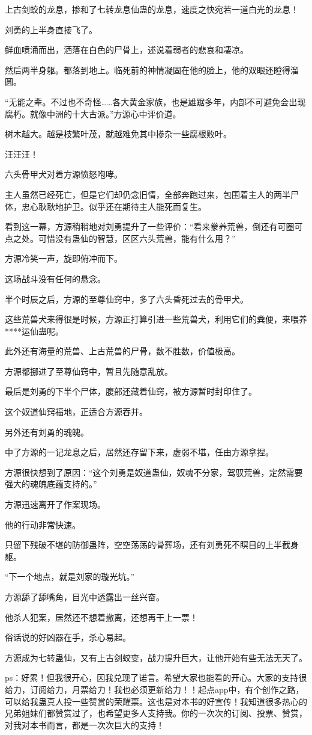 \begin{this_body}
上古剑蛟的龙息，掺和了七转龙息仙蛊的龙息，速度之快宛若一道白光的龙息！

刘勇的上半身直接飞了。

鲜血喷涌而出，洒落在白色的尸骨上，述说着弱者的悲哀和凄凉。

然后两半身躯。都落到地上。临死前的神情凝固在他的脸上，他的双眼还瞪得溜圆。

“无能之辈。不过也不奇怪……各大黄金家族，也是雄踞多年，内部不可避免会出现腐朽。就像中洲的十大古派。”方源心中评价道。

树木越大。越是枝繁叶茂，就越难免其中掺杂一些腐根败叶。

汪汪汪！

六头骨甲犬对着方源愤怒咆哮。

主人虽然已经死亡，但是它们却仍念旧情，全部奔跑过来，包围着主人的两半尸体，忠心耿耿地护卫。似乎还在期待主人能死而复生。

看到这一幕，方源稍稍地对刘勇提升了一些评价：“看来豢养荒兽，倒还有可圈可点之处。可惜没有蛊仙的智慧，区区六头荒兽，能有什么用？”

方源冷笑一声，旋即俯冲而下。

这场战斗没有任何的悬念。

半个时辰之后，方源的至尊仙窍中，多了六头昏死过去的骨甲犬。

这些荒兽犬来得很是时候，方源正打算引进一些荒兽犬，利用它们的粪便，来喂养****运仙蛊呢。

此外还有海量的荒兽、上古荒兽的尸骨，数不胜数，价值极高。

方源都挪进了至尊仙窍中，暂且先随意乱放。

最后是刘勇的下半个尸体，腹部还藏着仙窍，被方源暂时封印住了。

这个奴道仙窍福地，正适合方源吞并。

另外还有刘勇的魂魄。

中了方源的一记龙息之后，居然还存留下来，虚弱不堪，任由方源拿捏。

方源很快想到了原因：“这个刘勇是奴道蛊仙，奴魂不分家，驾驭荒兽，定然需要强大的魂魄底蕴支持的。”

方源迅速离开了作案现场。

他的行动非常快速。

只留下残破不堪的防御蛊阵，空空荡荡的骨葬场，还有刘勇死不瞑目的上半截身躯。

“下一个地点，就是刘家的璇光坑。”

方源舔了舔嘴角，目光中透露出一丝兴奋。

他杀人犯案，居然还不想着撤离，还想再干上一票！

俗话说的好凶器在手，杀心易起。

方源成为七转蛊仙，又有上古剑蛟变，战力提升巨大，让他开始有些无法无天了。

ps：好累！但我很开心，因我兑现了诺言。希望大家也能看的开心。大家的支持很给力，订阅给力，月票给力！我也必须更新给力！！起点app中，有个创作之路，可以给我蛊真人投一些赞赏的荣耀票。这也是对本书的好宣传！我知道很多热心的兄弟姐妹们都赞赏过了，也希望更多人支持我。你的一次次的订阅、投票、赞赏，对我对本书而言，都是一次次巨大的支持！

\end{this_body}


